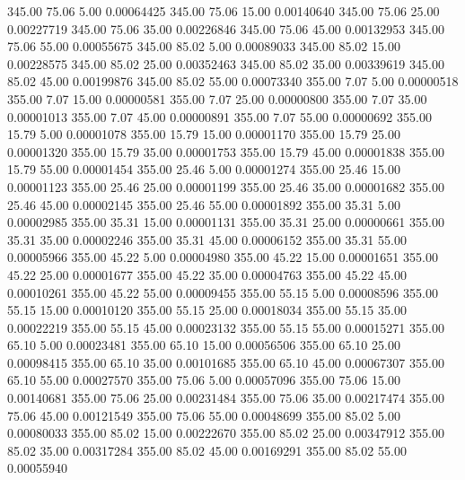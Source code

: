     345.00     75.06      5.00     0.00064425
    345.00     75.06     15.00     0.00140640
    345.00     75.06     25.00     0.00227719
    345.00     75.06     35.00     0.00226846
    345.00     75.06     45.00     0.00132953
    345.00     75.06     55.00     0.00055675
    345.00     85.02      5.00     0.00089033
    345.00     85.02     15.00     0.00228575
    345.00     85.02     25.00     0.00352463
    345.00     85.02     35.00     0.00339619
    345.00     85.02     45.00     0.00199876
    345.00     85.02     55.00     0.00073340
    355.00      7.07      5.00     0.00000518
    355.00      7.07     15.00     0.00000581
    355.00      7.07     25.00     0.00000800
    355.00      7.07     35.00     0.00001013
    355.00      7.07     45.00     0.00000891
    355.00      7.07     55.00     0.00000692
    355.00     15.79      5.00     0.00001078
    355.00     15.79     15.00     0.00001170
    355.00     15.79     25.00     0.00001320
    355.00     15.79     35.00     0.00001753
    355.00     15.79     45.00     0.00001838
    355.00     15.79     55.00     0.00001454
    355.00     25.46      5.00     0.00001274
    355.00     25.46     15.00     0.00001123
    355.00     25.46     25.00     0.00001199
    355.00     25.46     35.00     0.00001682
    355.00     25.46     45.00     0.00002145
    355.00     25.46     55.00     0.00001892
    355.00     35.31      5.00     0.00002985
    355.00     35.31     15.00     0.00001131
    355.00     35.31     25.00     0.00000661
    355.00     35.31     35.00     0.00002246
    355.00     35.31     45.00     0.00006152
    355.00     35.31     55.00     0.00005966
    355.00     45.22      5.00     0.00004980
    355.00     45.22     15.00     0.00001651
    355.00     45.22     25.00     0.00001677
    355.00     45.22     35.00     0.00004763
    355.00     45.22     45.00     0.00010261
    355.00     45.22     55.00     0.00009455
    355.00     55.15      5.00     0.00008596
    355.00     55.15     15.00     0.00010120
    355.00     55.15     25.00     0.00018034
    355.00     55.15     35.00     0.00022219
    355.00     55.15     45.00     0.00023132
    355.00     55.15     55.00     0.00015271
    355.00     65.10      5.00     0.00023481
    355.00     65.10     15.00     0.00056506
    355.00     65.10     25.00     0.00098415
    355.00     65.10     35.00     0.00101685
    355.00     65.10     45.00     0.00067307
    355.00     65.10     55.00     0.00027570
    355.00     75.06      5.00     0.00057096
    355.00     75.06     15.00     0.00140681
    355.00     75.06     25.00     0.00231484
    355.00     75.06     35.00     0.00217474
    355.00     75.06     45.00     0.00121549
    355.00     75.06     55.00     0.00048699
    355.00     85.02      5.00     0.00080033
    355.00     85.02     15.00     0.00222670
    355.00     85.02     25.00     0.00347912
    355.00     85.02     35.00     0.00317284
    355.00     85.02     45.00     0.00169291
    355.00     85.02     55.00     0.00055940